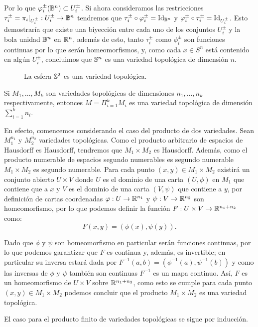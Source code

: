 \begin{example}[$n-$Esfera]
	Por lo que $\phi_i^{\pm}(\B^n) \subset U_{i}^{\pm}$. Si ahora consideramos las restricciones $\tau_i^{\pm} = \pi_i |_{U_i^{\pm}}: U_i^{\pm} \to \B^n$ tendremos que $\tau_i^{\pm} \circ \phi_i^{\pm} = \id_{\B^n}$ y $\phi_i^{\pm} \circ \tau_i^{\pm} = \id_{U_i^{\pm}}$. Esto demostraría que existe una biyección entre cada uno de los conjuntos $U_i^{\pm}$ y la bola unidad $\B^n$ en $\R^n$, además de esto, tanto $\tau_i^{\pm}$ como $\phi_i^{\pm}$ son funciones continuas por lo que serán homeomorfismos, y, como cada $x \in S^n$ está contenido en algún $U_i^{\pm}$, concluimos que $\S^n$ es una variedad topológica de dimensión $n$.
\end{example}

\begin{figure}[h!]
	\centering
	
	\caption{La esfera $\S^{2}$ es una variedad topológica.}
\end{figure}

\begin{example}\label{Ex: Variedad Topologica - Producto de Variedades}
	Si $M_1, \hdots, M_k$ son variedades topológicas de dimensiones $n_1,\hdots,n_k$ respectivamente, entonces $M = \Pi_{i=1}^k M_i$ es una variedad topológica de dimensión $\sum_{i=1}^k n_i$.

	En efecto, comencemos considerando el caso del producto de dos variedades. Sean $M_{1}^{n_1}$ y $M_{2}^{n_2}$ variedades topológicas. Como el producto arbitrario de espacios de Hausdorff es Hausdorff, tendremos que $M_1 \times M_2$ es Hausdorff. Además, como el producto numerable de espacios segundo numerables es segundo numerable $M_1 \times M_2$ es segundo numerable.
	Para cada punto $(x,y) \in M_1 \times M_2$ existirá un conjunto abierto $U \times V$ donde $U$ es el dominio de una carta $(U,\phi)$ en $M_1$ que contiene que a $x$ y $V$ es el dominio de una carta $(V,\psi)$ que contiene a $y$, por definición de cartas coordenadas $\phi: U \to \R^{n_1}$ y $\psi: V \to \R^{n_2}$ son homeomorfismo, por lo que podemos definir la función $F: U \times V \to \R^{n_1 + n_2}$ como:
	\[
		F(x,y) = (\phi(x),\psi(y)).
	\]

	Dado que $\phi$ y $\psi$ son homeomorfismo en particular serán funciones continuas, por lo que podemos garantizar que $F$ es continua y, además, es invertible; en particular su inversa estará dada por $F^{-1}(a,b) = (\phi^{-1}(a),\psi^{-1}(b))$ y como las inversas de $\phi$  y $\psi$ también son continuas $F^{-1}$ es un mapa continuo. Así, $F$ es un homeomorfismo de $U \times V$ sobre $\R^{n_1 + n_2}$, como esto se cumple para cada punto $(x,y) \in M_1 \times M_2$ podemos concluir que el producto $M_1 \times M_2$ es una variedad topológica.

	El caso para el producto finito de variedades topológicas se sigue por inducción.
\end{example}


